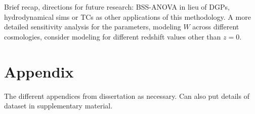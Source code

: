 \documentclass[11pt]{article}
\begin{document}
Brief recap, directions for future research: BSS-ANOVA in lieu of DGPs, hydrodynamical sims or TCs as other applications of this methodology. A more detailed sensitivity analysis for the parameters, modeling $W$ across different cosmologies, consider modeling for different redshift values other than $z=0$.

\section{Appendix}
\label{sec:apdx}

The different appendices from dissertation as necessary. Can also put details of dataset in supplementary material.



\end{document}
